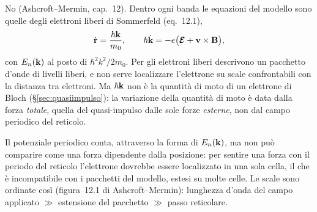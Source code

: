 \documentclass[11pt,a4paper]{article}
\begin{document}
No (Ashcroft--Mermin, cap.~12). Dentro ogni banda le equazioni del modello sono quelle degli elettroni liberi di Sommerfeld (eq.~12.1),
\[
\dot{\mathbf r}=\frac{\hbar\mathbf k}{m_0},\qquad\hbar\dot{\mathbf k}=-e\bigl(\boldsymbol{\mathcal E}+\mathbf v\times\mathbf B\bigr),
\]
con $E_n(\mathbf k)$ al posto di $\hbar^2k^2/2m_0$. Per gli elettroni liberi descrivono un pacchetto d'onde di livelli liberi, e non serve localizzare
l'elettrone su scale confrontabili con la distanza tra elettroni. Ma $\hbar\mathbf k$ non è la quantità di moto di un elettrone di Bloch (§\ref{sec:quasiimpulso}):
la variazione della quantità di moto è data dalla forza \emph{totale}, quella del quasi-impulso dalle sole forze \emph{esterne}, non dal campo
periodico del reticolo.
\begin{interpretazione}
Il potenziale periodico conta, attraverso la forma di $E_n(\mathbf k)$, ma non può comparire come una forza dipendente dalla posizione: per sentire una
forza con il periodo del reticolo l'elettrone dovrebbe essere localizzato in una sola cella, il che è incompatibile con i pacchetti del modello, estesi
su molte celle. Le scale sono ordinate così (figura~12.1 di Ashcroft--Mermin): lunghezza d'onda del campo applicato $\gg$ estensione del pacchetto
$\gg$ passo reticolare.
\end{interpretazione}
\end{document}
